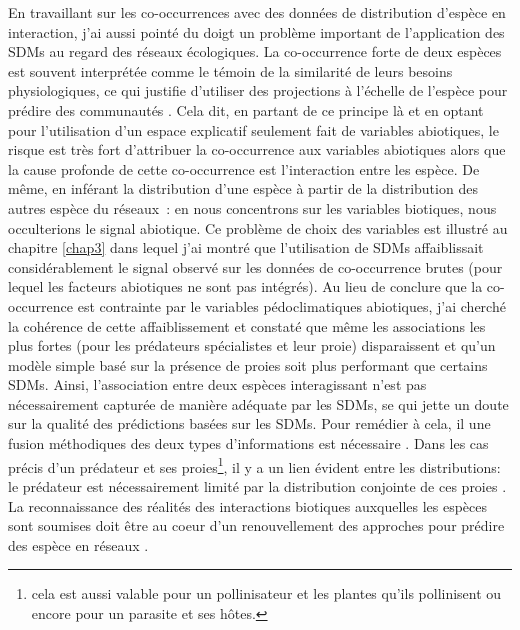 En travaillant sur les co-occurrences avec des données de distribution
d'espèce en interaction, j'ai aussi pointé du doigt un problème
important de l'application des SDMs au regard des réseaux écologiques.
La co-occurrence forte de deux espèces est souvent interprétée comme le
témoin de la similarité de leurs besoins physiologiques, ce qui justifie
d'utiliser des projections à l'échelle de l'espèce pour prédire des
communautés \citep{Rehfeldt2006, Albouy2012}. Cela dit, en partant de ce
principe là et en optant pour l'utilisation d'un espace explicatif
seulement fait de variables abiotiques, le risque est très fort
d'attribuer la co-occurrence aux variables abiotiques alors que la cause
profonde de cette co-occurrence est l'interaction entre les espèce. De
même, en inférant la distribution d'une espèce à partir de la
distribution des autres espèce du réseaux~: en nous concentrons sur les
variables biotiques, nous occulterions le signal abiotique. Ce problème
de choix des variables est illustré au chapitre \ref{chap3} dans lequel
j'ai montré que l'utilisation de SDMs affaiblissait considérablement le
signal observé sur les données de co-occurrence brutes (pour lequel les
facteurs abiotiques ne sont pas intégrés). Au lieu de conclure que la
co-occurrence est contrainte par le variables pédoclimatiques
abiotiques, j'ai cherché la cohérence de cette affaiblissement et
constaté que même les associations les plus fortes (pour les prédateurs
spécialistes et leur proie) disparaissent et qu'un modèle simple basé
sur la présence de proies soit plus performant que certains SDMs. Ainsi,
l'association entre deux espèces interagissant n'est pas nécessairement
capturée de manière adéquate par les SDMs, se qui jette un doute sur la
qualité des prédictions basées sur les SDMs. Pour remédier à cela, il
une fusion méthodiques des deux types d'informations est nécessaire
\citetext{\citealp[~]{Meier2010}; \citealp{Thuilier2013}}. Dans les cas
précis d'un prédateur et ses proies\footnote{cela est aussi valable pour
  un pollinisateur et les plantes qu'ils pollinisent ou encore pour un
  parasite et ses hôtes.}, il y a un lien évident entre les
distributions: le prédateur est nécessairement limité par la
distribution conjointe de ces proies \citep{Holt2009, Shenbrot2007}. La
reconnaissance des réalités des interactions biotiques auxquelles les
espèces sont soumises doit être au coeur d'un renouvellement des
approches pour prédire des espèce en réseaux \citep{Godsoe2015}.

